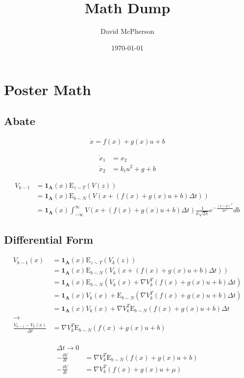 \documentclass[a4paper]{article}
\title{Math Dump}
\author{David McPherson}
\date{\today}
\begin{document}
\section{Poster Math}
  \subsection{Abate}

  \begin{align*}
  \dot{x} = f(x) + g(x) u + b
  \end{align*}

  \begin{align*}
  \dot{x}_1 &= x_2
  \\
  \dot{x}_2 &= k_t u^2 + g + b
  \end{align*}

  \begin{align*}
  V_{k-1} & = \mathbf{1_A}(x) \mathrm{E}_{z \sim T} (V(z))
  \\ & = \mathbf{1_A}(x) \mathrm{E}_{b\sim N} (V( x + (f(x) + g(x) u + b) \Delta t) )
  \\ & = \mathbf{1_A}(x) \int_{-\infty}^{\infty} V( x + (f(x) + g(x) u + b) \Delta t) \frac{1}{\sigma \sqrt{2 \pi}} e^{-\frac{(x-\mu)^2}{2 \sigma^2}} db
  \end{align*}

  \subsection{Differential Form}

  \begin{align*}
  V_{k-1}(x) & = \mathbf{1_A}(x) \mathrm{E}_{z \sim T} (V_k(z))
  \\ & = \mathbf{1_A}(x) \mathrm{E}_{b\sim N} (V_k( x + (f(x) + g(x) u + b) \Delta t) )
  \\ & = \mathbf{1_A}(x) \mathrm{E}_{b\sim N} (V_k( x ) + \nabla V_k^T (f(x) + g(x) u + b) \Delta t )
  \\ & = \mathbf{1_A}(x) V_k(x) + \mathrm{E}_{b\sim N} ( \nabla V_k^T (f(x) + g(x) u + b) \Delta t )
  \\ & = \mathbf{1_A}(x) V_k(x) + \nabla V_k^T \mathrm{E}_{b\sim N} ( f(x) + g(x) u + b ) \Delta t
  \\ \rightarrow
  \\ \frac{V_{k-1} - V_k(x)}{\Delta t} &= \nabla V_k^T \mathrm{E}_{b\sim N} ( f(x) + g(x) u + b )
  \end{align*}

  \begin{align*}
  \\ \Delta t \rightarrow 0
  \\ -\frac{\delta V}{\delta t} &= \nabla V_k^T \mathrm{E}_{b\sim N} ( f(x) + g(x) u + b )
  \\ -\frac{\delta V}{\delta t} &= \nabla V_k^T ( f(x) + g(x) u + \mu )
  \end{align*}
\end{document}
